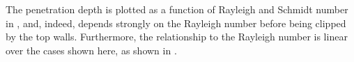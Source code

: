 The penetration depth is plotted as a function of Rayleigh and Schmidt number in , and, indeed, depends strongly on the Rayleigh number before being clipped by the top walls.
Furthermore, the relationship to the Rayleigh number is linear over the cases shown here, as shown in .

